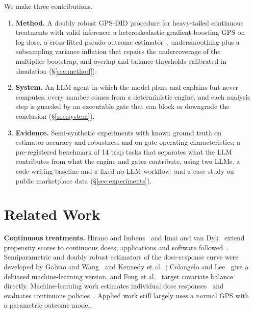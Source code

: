 \documentclass[sigconf,anonymous,review]{acmart}
\begin{document}
We make three contributions.
\begin{enumerate}
\item \textbf{Method.} A doubly robust GPS-DID procedure for heavy-tailed continuous treatments with valid inference: a heteroskedastic gradient-boosting GPS on log dose, a cross-fitted pseudo-outcome estimator~\cite{kennedy2017nonparametric}, undersmoothing plus a subsampling variance inflation that repairs the undercoverage of the multiplier bootstrap, and overlap and balance thresholds calibrated in simulation (\S\ref{sec:method}).
\item \textbf{System.} An LLM agent in which the model plans and explains but never computes; every number comes from a deterministic engine, and each analysis step is guarded by an executable gate that can block or downgrade the conclusion (\S\ref{sec:system}).
\item \textbf{Evidence.} Semi-synthetic experiments with known ground truth on estimator accuracy and robustness and on gate operating characteristics; a pre-registered benchmark of 14 trap tasks that separates what the LLM contributes from what the engine and gates contribute, using two LLMs, a code-writing baseline and a fixed no-LLM workflow; and a case study on public marketplace data (\S\ref{sec:experiments}).
\end{enumerate}

\section{Related Work}

\textbf{Continuous treatments.} Hirano and Imbens~\cite{hirano2004propensity} and Imai and van Dyk~\cite{imai2004causal} extend propensity scores to continuous doses; applications and software followed~\cite{flores2012estimating,bia2008stata}. Semiparametric and doubly robust estimators of the dose-response curve were developed by Galvao and Wang~\cite{galvao2015uniformly} and Kennedy et al.~\cite{kennedy2017nonparametric}; Colangelo and Lee~\cite{colangelo2020double} give a debiased machine-learning version, and Fong et al.~\cite{fong2018covariate} target covariate balance directly. Machine-learning work estimates individual dose responses~\cite{schwab2020learning,nie2021vcnet} and evaluates continuous policies~\cite{kallus2018policy}. Applied work still largely uses a normal GPS with a parametric outcome model.
\end{document}
